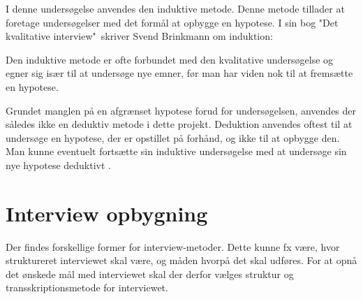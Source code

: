 \par
I denne undersøgelse anvendes den induktive metode. Denne metode tillader at foretage undersøgelser med det formål at opbygge en hypotese. 
I sin bog "Det kvalitative interview"\ skriver Svend Brinkmann om induktion:
\par
{} \citep{brinkmann2014}
\par
Den induktive metode er ofte forbundet med den kvalitative undersøgelse og egner sig især til at undersøge nye emner, før man har viden nok til at fremsætte en hypotese. 
\par
Grundet manglen på en afgrænset hypotese forud for undersøgelsen, anvendes der således ikke en deduktiv metode i dette projekt. Deduktion anvendes oftest til at undersøge en hypotese, der er opstillet på forhånd, og ikke til at opbygge den. Man kunne eventuelt fortsætte sin induktive undersøgelse med at undersøge sin nye hypotese deduktivt \cite{deduktiv}.



\section{Interview opbygning}
Der findes forskellige former for interview-metoder. Dette kunne fx være, hvor struktureret interviewet skal være, og måden hvorpå det skal udføres. For at opnå det ønskede mål med interviewet skal der derfor vælges struktur og transskriptionsmetode for interviewet.

